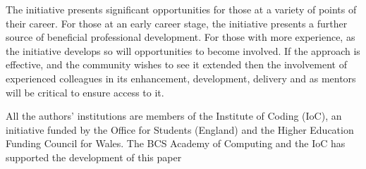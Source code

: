 \documentclass[sigconf]{acmart}
\begin{document}
The initiative presents significant opportunities for those at a variety of points of their career. For those at an early career stage, the initiative presents a further source of beneficial professional development. For those with more experience, as the initiative develops so will opportunities to become involved. If the approach is effective, and the community wishes to see it extended then the involvement of experienced colleagues in its enhancement, development, delivery and as mentors will be critical to ensure access to it.

\begin{acks}
 
  All the authors' institutions are members of the Institute of Coding (IoC), an initiative funded by the Office for Students (England) and the Higher Education Funding Council for Wales. The BCS Academy of Computing and the IoC has supported the development of this paper
 

\end{acks}





\balance
\end{document}
